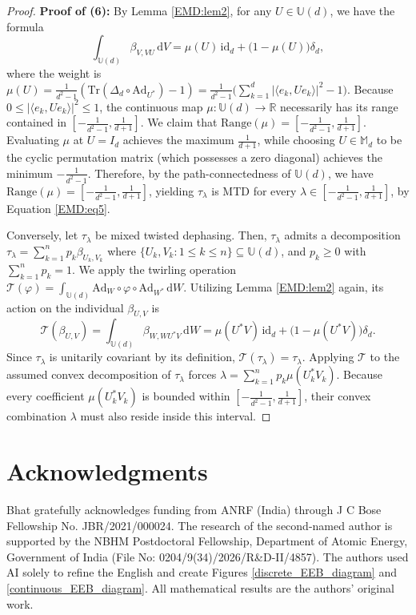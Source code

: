 \documentclass[11pt,reqno]{amsart}
\theoremstyle{definition}
\theoremstyle{plain}
\theoremstyle{remark}
\newcommand{\la}{\langle}
\newcommand{\ra}{\rangle}
\numberwithin{equation}{section}%
\begin{document}
\begin{proof}
  	
  	
  	\noindent\textbf{Proof of (6):} By Lemma \ref{EMD:lem2}, for any $U\in\mathbb{U}(d)$, we have the formula
  	\begin{equation}\label{EMD:eq5}
  		\int_{\mathbb{U}(d)} \beta_{V, VU} \, \mathrm{d}V = \mu(U)\,\text{id}_d + \big(1 - \mu(U)\big)\delta_d,
  	\end{equation}
  	where the weight is $\mu(U) =\frac{1}{d^2-1}(\text{Tr}(\Delta_d\circ\text{Ad}_{U^*})-1)= \frac{1}{d^2-1} \big( \sum_{k=1}^d |\la e_k, U e_k \ra|^2 - 1 \big)$. Because $0 \le |\la e_k, U e_k \ra|^2 \le 1$, the continuous map $\mu: \mathbb{U}(d) \to \mathbb{R}$ necessarily has its range contained in $\left[-\frac{1}{d^2-1}, \frac{1}{d+1}\right]$. We claim that $\text{Range}(\mu)=\left[-\frac{1}{d^2-1}, \frac{1}{d+1}\right]$. Evaluating $\mu$ at $U = I_d$ achieves the maximum $\frac{1}{d+1}$, while choosing $U\in \mathbb{M}_d$ to be the cyclic permutation matrix (which possesses a zero diagonal) achieves the minimum $-\frac{1}{d^2-1}$. Therefore, by the path-connectedness of $\mathbb{U}(d)$, we have $\text{Range}(\mu)=\left[-\frac{1}{d^2-1}, \frac{1}{d+1}\right]$, yielding $\tau_\lambda$ is MTD for every $\lambda\in\left[-\frac{1}{d^2-1}, \frac{1}{d+1}\right]$, by Equation \ref{EMD:eq5}.
  	
  	
  	
  	Conversely, let $\tau_\lambda$ be mixed twisted dephasing. Then, $\tau_\lambda$ admits a decomposition $\tau_\lambda= \sum_{k=1}^n p_k \beta_{U_k, V_k}$ where $\{U_k,V_k:1\leq k\leq n\}\subseteq\mathbb{U}(d)$, and $p_k\geq 0$ with $\sum_{k=1}^n p_k=1$. We apply the twirling operation $\mathscr{T}(\varphi) = \int_{\mathbb{U}(d)} \text{Ad}_W \circ \varphi \circ \text{Ad}_{W^*} \, \mathrm{d}W$. Utilizing Lemma \ref{EMD:lem2} again, its action on the individual $\beta_{U,V}$ is
  	\[
  	\mathscr{T}(\beta_{U, V}) = \int_{\mathbb{U}(d)} \beta_{W, W U^* V} \, \mathrm{d}W = \mu(U^* V)\,\text{id}_d + \big(1 - \mu(U^* V)\big)\delta_d.
  	\]
  	Since $\tau_\lambda$ is unitarily covariant by its definition, $\mathscr{T}(\tau_\lambda) = \tau_\lambda$. Applying $\mathscr{T}$ to the assumed convex decomposition of $\tau_\lambda$ forces $\lambda= \sum_{k=1}^n p_k \mu(U_k^* V_k)$. Because every coefficient $\mu(U_k^* V_k)$ is bounded within $\left[-\frac{1}{d^2-1}, \frac{1}{d+1}\right]$, their convex combination $\lambda$ must also reside inside this interval.
  \end{proof} 

  
  \section{Acknowledgments}
  Bhat gratefully acknowledges funding from ANRF (India) through J C Bose Fellowship No. JBR/2021/000024. The research of the second-named author is supported by the NBHM Postdoctoral Fellowship, Department of Atomic Energy, Government of India (File No: 0204/9(34)/2026/R\&D-II/4857). The authors used AI solely to refine the English and create Figures \ref{discrete_EEB_diagram} and \ref{continuous_EEB_diagram}. All mathematical results are the authors' original work.




 

    		
    		

%
	
\end{document}
